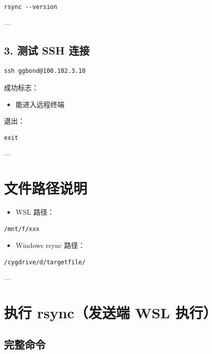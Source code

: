 \documentclass[UTF8]{ctexart}
\begin{document}
\begin{lstlisting}
rsync --version
\end{lstlisting}

---

\subsection{3. 测试 SSH 连接}

\begin{lstlisting}
ssh ggbond@100.102.3.10
\end{lstlisting}

成功标志：

\begin{itemize}
\item 能进入远程终端
\end{itemize}

退出：

\begin{lstlisting}
exit
\end{lstlisting}

---

\section{文件路径说明}

\begin{itemize}
\item WSL 路径：
\end{itemize}

\begin{lstlisting}
/mnt/f/xxx
\end{lstlisting}

\begin{itemize}
\item Windows rsync 路径：
\end{itemize}

\begin{lstlisting}
/cygdrive/d/targetfile/
\end{lstlisting}

---

\section{执行 rsync（发送端 WSL 执行）}

\subsection{完整命令}
\end{document}
